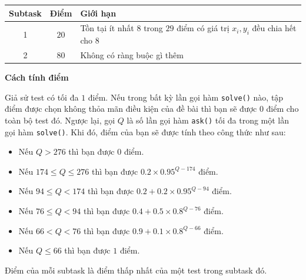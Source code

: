 \begin{center}
  \begin{tabular}{|c|c|l|} \hline
    \textbf{Subtask} & \textbf{Điểm} & \textbf{Giới hạn} \\ \hline
    1 & $20$ & Tồn tại ít nhất $8$ trong $29$ điểm có giá trị $x_i,y_i$ đều chia hết cho $8$ \\ \hline
    2 & $80$ & Không có ràng buộc gì thêm \\ \hline
  \end{tabular}
\end{center}

\textbf{Cách tính điểm}

Giả sử test có tối đa $1$ điểm. Nếu trong bất kỳ lần gọi hàm \texttt{solve()} nào, tập điểm được chọn không thỏa mãn điều kiện của đề bài thì bạn sẽ được $0$ điểm cho toàn bộ test đó. Ngược lại, gọi $Q$ là số lần gọi hàm \texttt{ask()} tối đa trong một lần gọi hàm \texttt{solve()}. Khi đó, điểm của bạn sẽ được tính theo công thức như sau:
\begin{itemize}
   \item Nếu $Q>276$ thì bạn được $0$ điểm.
   \item Nếu $174 \le Q\le 276$ thì bạn được $0.2 \times 0.95^{Q-174}$ điểm.
   \item Nếu $94 \le Q< 174$ thì bạn được $0.2 + 0.2 \times 0.95^{Q-94}$ điểm.
   \item Nếu $76\le Q< 94$ thì bạn được $0.4 + 0.5 \times 0.8^{Q-76}$ điểm.
   \item Nếu $66<Q<76$ thì bạn được $0.9 + 0.1 \times 0.8^{Q-66}$ điểm.
   \item Nếu $Q\le 66$ thì bạn được $1$ điểm.
\end{itemize}

Điểm của mỗi subtask là điểm thấp nhất của một test trong subtask đó.